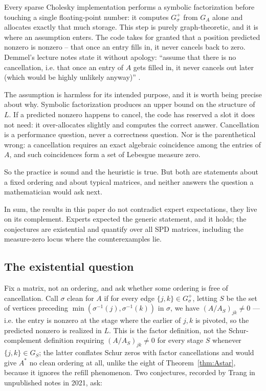 \documentclass[11pt]{article}
\theoremstyle{plain}
\theoremstyle{definition}
\theoremstyle{remark}
\begin{document}
\begin{humanblock}
Every sparse Cholesky implementation performs a symbolic factorization before touching a single floating-point number: it computes $G^+_\sigma$ from $G_A$ alone and allocates exactly that much storage. This step is purely graph-theoretic, and it is where an assumption enters. The code takes for granted that a position predicted nonzero is nonzero -- that once an entry fills in, it never cancels back to zero. Demmel's lecture notes state it without apology: ``assume that there is no cancellation, i.e. that once an entry of $A$ gets filled in, it never cancels out later (which would be highly unlikely anyway)'' \cite{Demmel}.

The assumption is harmless for its intended purpose, and it is worth being precise about why. Symbolic factorization produces an upper bound on the structure of $L$. If a predicted nonzero happens to cancel, the code has reserved a slot it does not need: it over-allocates slightly and computes the correct answer. Cancellation is a performance question, never a correctness question. Nor is the parenthetical wrong: a cancellation requires an exact algebraic coincidence among the entries of $A$, and such coincidences form a set of Lebesgue measure zero.

So the practice is sound and the heuristic is true. But both are statements about a fixed ordering and about typical matrices, and neither answers the question a mathematician would ask next.

In sum, the results in this paper do not contradict expert expectations, they live on its complement. Experts expected the generic statement, and it holds; the conjectures are existential and quantify over all SPD matrices, including the measure-zero locus where the counterexamples lie. 

\subsection{The existential question}\label{sec:intro-exist}

Fix a matrix, not an ordering, and ask whether some ordering is free of cancellation. Call $\sigma$ clean for $A$ if for every edge $\{j,k\}\in G^+_\sigma$, letting $S$ be the set of vertices preceding $\min(\sigma^{-1}(j),\sigma^{-1}(k))$ in $\sigma$, we have $(A/A_S)_{jk}\neq0$ — i.e. the entry is nonzero at the stage where the earlier of $j,k$ is pivoted, so the predicted nonzero is realized in $L$. This is the factor definition, not the Schur-complement definition requiring $(A/A_S)_{jk}\neq0$ for every stage $S$ whenever $\{j,k\}\in G_S$; the latter conflates Schur zeros with factor cancellations and would give $A^*$ no clean ordering at all, unlike the eight of Theorem~\ref{thm:Astar}, because it ignores the refill phenomenon. Two conjectures, recorded by Trang in unpublished notes in 2021, ask:
\newline


\end{humanblock}
\end{document}
